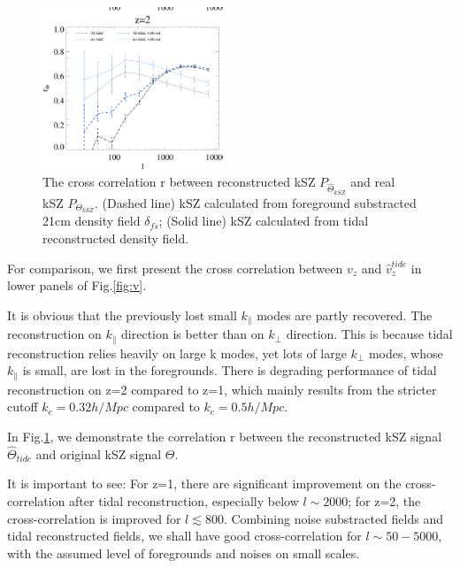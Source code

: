 \begin{figure}[tbp]
\begin{center}
\includegraphics[width=0.48\textwidth]{cl_correlation_z1_z2.eps}
\end{center}
\vspace{-0.7cm}
\caption{The cross correlation r between reconstructed kSZ $P_{\hat \Theta_{kSZ}}$ 
and real kSZ $P_{\Theta_{kSZ}}$.
    (Dashed line) kSZ calculated from foreground substracted 21cm density field $\delta_{fs}$;
    (Solid line) kSZ calculated from tidal reconstructed density field.
}
\label{fig:r}
\end{figure}

For comparison, we first present the cross correlation between $v_z$ and $\hat v_z^{tide}$ in lower panels of Fig.\ref{fig:v}. 

It is obvious that the previously lost small $k_\parallel$ modes are partly recovered. 
The reconstruction on $k_\parallel$ direction is better than on $k_\perp$ direction.
This is because tidal reconstruction relies heavily on large k modes, 
yet lots of large $k_\perp$ modes, whose $k_\parallel$ is small, are lost in the foregrounds. 
There is degrading performance of tidal reconstruction on z=2 compared to z=1, 
which mainly results from the stricter cutoff $k_c=0.32 h/Mpc$ compared to $k_c=0.5 h/Mpc$.

In Fig.\ref{fig:r}, 
we demonstrate the correlation r between the reconstructed kSZ signal $\hat \Theta_{tide}$ and original kSZ signal $\Theta$. 

It is important to see:
For z=1, there are significant improvement on the cross-correlation after tidal reconstruction, especially below $l\sim 2000$; 
for z=2, the cross-correlation is improved for $l\lesssim 800$. 
Combining noise substracted fields and tidal reconstructed fields, we shall have good cross-correlation for $l \sim 50-5000$, 
with the assumed level of foregrounds and noises on small scales.


